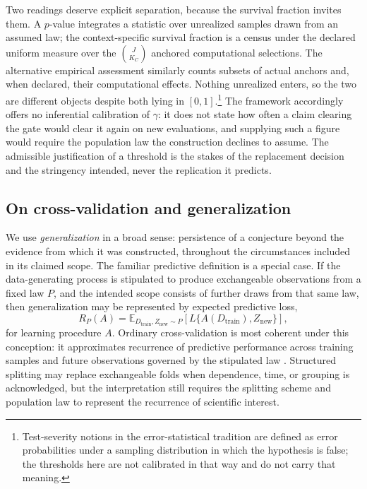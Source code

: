 \documentclass[11pt]{article}
\newcommand{\E}{\mathbb{E}}
\theoremstyle{remark}
\begin{document}
Two readings deserve explicit separation, because the survival fraction invites
them. A $p$-value integrates a statistic over unrealized samples drawn from an
assumed law; the context-specific survival fraction is a census under the declared uniform
measure over the $\binom{J}{K_C}$ anchored computational selections. The
alternative empirical assessment similarly counts subsets of actual anchors
and, when declared, their computational effects. Nothing unrealized enters, so the two are different objects despite
both lying in $[0,1]$.\footnote{Test-severity notions in the error-statistical
tradition are defined as error probabilities under a sampling distribution in
which the hypothesis is false; the thresholds here are not calibrated in that
way and do not carry that meaning.} The framework accordingly offers no
inferential calibration of $\gamma$: it does not state how often a claim
clearing the gate would clear it again on new evaluations, and supplying such a
figure would require the population law the construction declines to assume. The
admissible justification of a threshold is the stakes of the replacement
decision and the stringency intended, never the replication it predicts.

\subsection{On cross-validation and generalization}
\label{sec:cross-validation}

We use \emph{generalization} in a broad sense: persistence of a conjecture
beyond the evidence from which it was constructed, throughout the
circumstances included in its claimed scope. The familiar predictive
definition is a special case. If the data-generating process is stipulated to
produce exchangeable observations from a fixed law $P$, and the intended scope
consists of further draws from that same law, then generalization may be
represented by expected predictive loss,
\[
R_P(A)
=
\E_{D_{\mathrm{train}},Z_{\mathrm{new}}\sim P}
\left[
L\{A(D_{\mathrm{train}}),Z_{\mathrm{new}}\}
\right],
\]
for learning procedure $A$. Ordinary cross-validation is most coherent under
this conception: it approximates recurrence of predictive performance across
training samples and future observations governed by the stipulated law
\cite{arlot2010survey,bengio2004variance}. Structured splitting may replace
exchangeable folds when dependence, time, or grouping is acknowledged, but the
interpretation still requires the splitting scheme and population law to
represent the recurrence of scientific interest.
\end{document}
